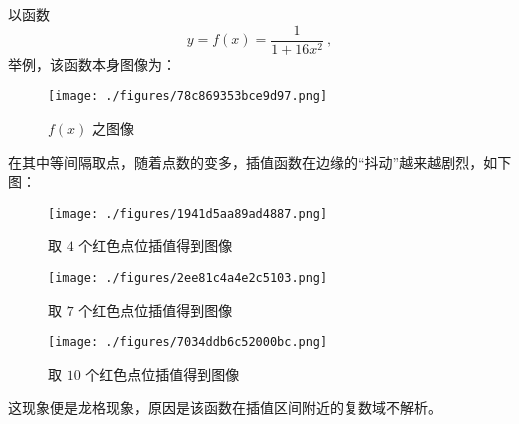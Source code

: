 以函数
$$y = f(x) = \frac1{1+16 x^2} ~,$$
举例，该函数本身图像为：
\begin{figure}[ht]
\centering
\texttt{[image: ./figures/78c869353bce9d97.png]}
\caption{$f(x)$ 之图像} \label{fig_PolyIP_1}
\end{figure}
在其中等间隔取点，随着点数的变多，插值函数在边缘的“抖动”越来越剧烈，如下图：
\begin{figure}[ht]
\centering
\texttt{[image: ./figures/1941d5aa89ad4887.png]}
\caption{取 $4$ 个红色点位插值得到图像} \label{fig_PolyIP_2}
\end{figure}
\begin{figure}[ht]
\centering
\texttt{[image: ./figures/2ee81c4a4e2c5103.png]}
\caption{取 $7$ 个红色点位插值得到图像} \label{fig_PolyIP_3}
\end{figure}
\begin{figure}[ht]
\centering
\texttt{[image: ./figures/7034ddb6c52000bc.png]}
\caption{取 $10$ 个红色点位插值得到图像} \label{fig_PolyIP_4}
\end{figure}
这现象便是龙格现象，原因是该函数在插值区间附近的复数域不解析。